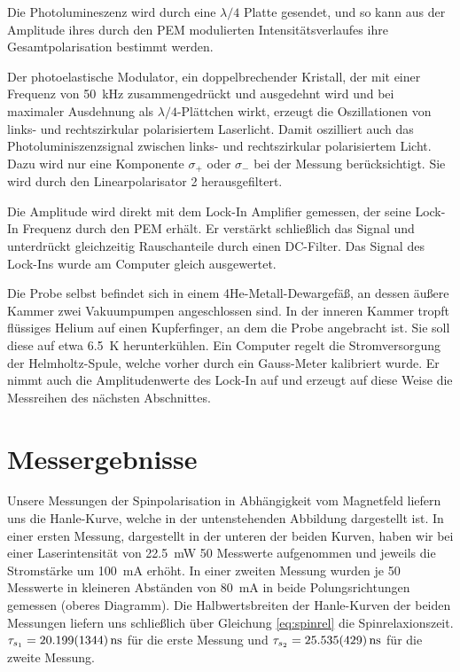 \documentclass[11pt,twoside=true]{scrartcl}
\begin{document}
Die Photolumineszenz wird durch eine $\lambda/4$ Platte gesendet, und so kann
aus der Amplitude ihres durch den PEM modulierten Intensitätsverlaufes ihre
Gesamtpolarisation bestimmt werden.

Der photoelastische Modulator, ein doppelbrechender Kristall, der mit einer
Frequenz von \SI{50}{\kilo\hertz} zusammengedrückt und ausgedehnt wird und bei
maximaler Ausdehnung als $\lambda/4$-Plättchen wirkt, erzeugt die Oszillationen
von links- und rechtszirkular polarisiertem Laserlicht. Damit oszilliert auch
das Photoluminiszenzsignal zwischen links- und rechtszirkular polarisiertem
Licht.  Dazu wird nur eine Komponente $\sigma_+$ oder $\sigma_-$ bei der
Messung berücksichtigt. Sie wird durch den Linearpolarisator 2 herausgefiltert.

Die Amplitude wird direkt mit dem Lock-In Amplifier gemessen, der seine Lock-In
Frequenz durch den PEM erhält.  Er verstärkt schließlich das Signal und
unterdrückt gleichzeitig Rauschanteile durch einen DC-Filter. Das Signal des
Lock-Ins wurde am Computer gleich ausgewertet.

Die Probe selbst befindet sich in einem 4He-Metall-Dewargefäß, an dessen äußere
Kammer zwei Vakuumpumpen angeschlossen sind. In der inneren Kammer tropft
flüssiges Helium auf einen Kupferfinger, an dem die Probe angebracht ist. Sie
soll diese auf etwa \SI{6.5}{\kelvin} herunterkühlen.  Ein Computer regelt die
Stromversorgung der Helmholtz-Spule, welche vorher durch ein Gauss-Meter
kalibriert wurde. Er nimmt auch die Amplitudenwerte des Lock-In auf und erzeugt
auf diese Weise die Messreihen des nächsten Abschnittes.  





\section{Messergebnisse}
Unsere Messungen der Spinpolarisation in Abhängigkeit vom Magnetfeld liefern
uns die Hanle-Kurve, welche in der untenstehenden Abbildung dargestellt ist. In
einer ersten Messung, dargestellt in der unteren der beiden Kurven, haben wir
bei einer Laserintensität von \SI{22.5}{\milli\watt} 50 Messwerte aufgenommen
und jeweils die Stromstärke um \SI{100}{\milli\ampere} erhöht. In einer zweiten
Messung wurden je 50 Messwerte in kleineren Abständen von
\SI{80}{\milli\ampere} in beide Polungsrichtungen gemessen (oberes Diagramm).
Die Halbwertsbreiten der Hanle-Kurven der beiden Messungen liefern uns
schließlich über Gleichung \ref{eq:spinrel} die Spinrelaxionszeit.
$
\tau_{s_1}=\SI{20.199 \pm 1.344}{\nano\second}
$
für die erste Messung und
$
\tau_{s_2}=\SI{25.535 \pm 0.429}{\nano\second}
$
für die zweite Messung.
\end{document}
